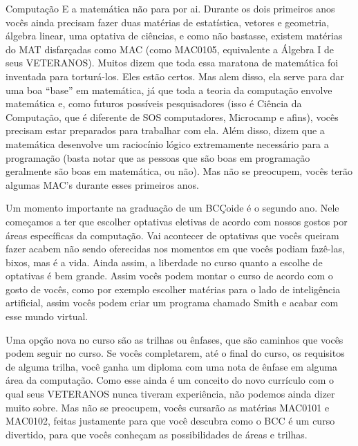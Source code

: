 \begin{subsecao}{Computação}
E a matemática não para por ai. Durante os dois primeiros anos vocês ainda
precisam fazer duas matérias de estatística, vetores e geometria, álgebra linear, uma
optativa de ciências, e como não bastasse, existem matérias do MAT disfarçadas
como MAC (como MAC0105, equivalente a Álgebra I de seus VETERANOS). Muitos dizem
que toda essa maratona de matemática foi inventada para torturá-los. Eles estão
certos. Mas alem disso, ela serve para dar uma boa ``base'' em matemática, já
que toda a teoria da computação envolve matemática e, como futuros possíveis
pesquisadores (isso é Ciência da Computação, que é diferente de SOS
computadores, Microcamp e afins), vocês precisam estar preparados para trabalhar
com ela. Além disso, dizem que a matemática desenvolve um raciocínio lógico
extremamente necessário para a programação (basta notar que as pessoas que são
boas em programação geralmente são boas em matemática, ou não). Mas não se
preocupem, vocês terão algumas MAC's durante esses primeiros anos.

Um momento importante na graduação de um BCÇoide é o segundo ano. Nele começamos
a ter que escolher optativas eletivas de acordo com nossos gostos por áreas
específicas da computação. Vai acontecer de optativas que vocês queiram fazer
acabem não sendo oferecidas nos momentos em que vocês podiam fazê-las, bixos,
mas é a vida. Ainda assim, a liberdade no curso quanto a escolhe de optativas é
bem grande. Assim vocês podem montar o curso de acordo com o gosto de vocês,
como por exemplo escolher matérias para o lado de inteligência artificial, assim
vocês podem criar um programa chamado Smith e acabar com esse mundo virtual.

Uma opção nova no curso são as trilhas ou ênfases, que são caminhos que vocês
podem seguir no curso. Se vocês completarem, até o final do curso, os requisitos
de alguma trilha, você ganha um diploma com uma nota de ênfase em alguma área da
computação. Como esse ainda é um conceito do novo currículo com o qual seus
VETERANOS nunca tiveram experiência, não podemos ainda dizer muito sobre. Mas
não se preocupem, vocês cursarão as matérias MAC0101 e MAC0102, feitas
justamente para que você descubra como o BCC é um curso divertido, para que
vocês conheçam as possibilidades de áreas e trilhas.


\end{subsecao}
